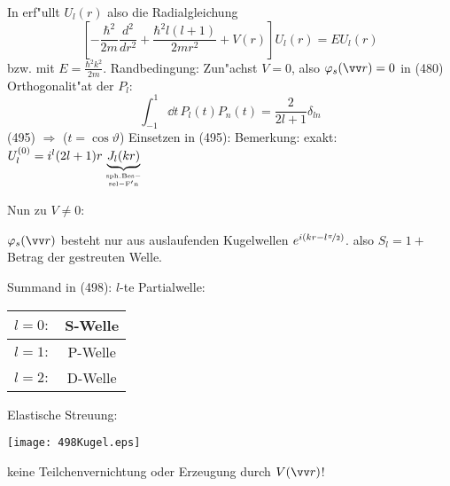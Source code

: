 \documentclass[a4paper]{scrartcl}
\begin{document}
In
erf"ullt $U_l(r)$ also die Radialgleichung
$$ \left[ - \frac{ \hbar^2}{2m} \frac{d^2}{dr^2} + \frac{\hbar^2 l(l+1)}{2mr^2} + V(r) \right] U_l(r) = E U_l (r)$$
bzw.
mit $E = \frac{\hbar^2 k^2}{2m}$.
Randbedingung:
Zun"achst $V=0$, also $\phi_s(\vv r) = 0$ in (480)
Orthogonalit"at der $P_l$:
$$\int_{-1}^1 \dd t \, P_l(t) P_n (t) = \frac{2}{2l +1} \delta_{l n}$$
(495) $\Longrightarrow$ ($t = \cos \vartheta$)
Einsetzen in (495):
Bemerkung: exakt: $U_l^{(0)} = i^l (2l + 1) r \underbrace{J_l(kr)}_{\mathrm{sph. Bes- \atop sel-F'n}}$

Nun zu $V \neq 0$:

$\phi_s(\vv r)$ besteht nur aus auslaufenden Kugelwellen $e^{i(kr - l\nicefrac \pi 2)}$.
also $S_l = 1 + $ Betrag der gestreuten Welle.

Summand in (498): $l$-te Partialwelle:
\begin{center}
\begin{tabular}{c | c}
$l=0:$ & S-Welle \\
\hline
$l=1:$ & P-Welle \\
\hline
$l=2:$ & D-Welle
\end{tabular}
\end{center}
Elastische Streuung:
\begin{center}
\texttt{[image: 498Kugel.eps]}
\end{center}
keine Teilchenvernichtung oder Erzeugung durch $V(\vv r)$!
\end{document}
